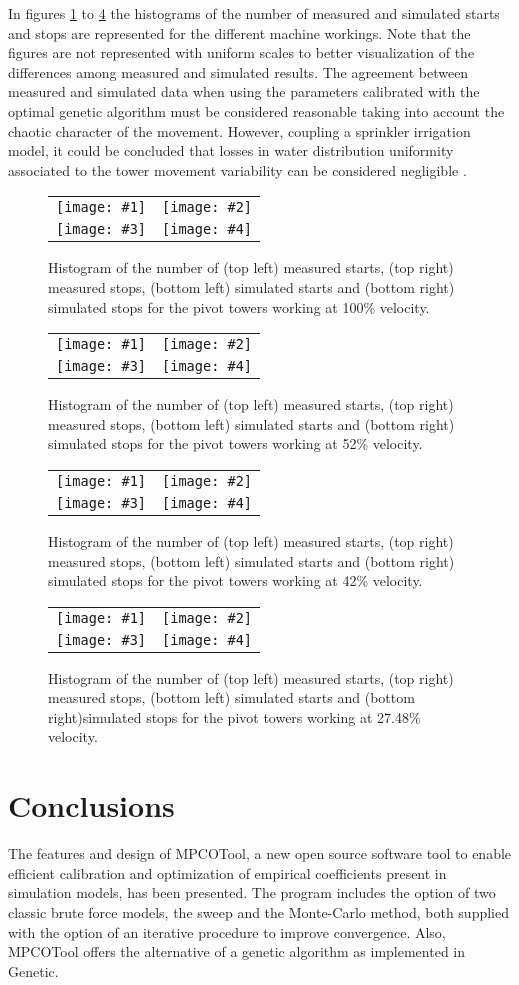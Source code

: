 \documentclass[review,authoryear]{elsarticle}
\newcommand{\FIGIV}[6]
{
	\begin{figure}[ht!]
		\centering
		\begin{tabular}{cc}
			\texttt{[image: \#1]} & \texttt{[image: \#2]} \\
			\texttt{[image: \#3]} & \texttt{[image: \#4]}
		\end{tabular}
		\caption{#5.\label{#6}}
	\end{figure}
}
\begin{document}
In figures \ref{FigPivot100} to \ref{FigPivot27} the histograms of the number
of measured and simulated starts and stops are represented for the different
machine workings.
Note that the figures are not represented with uniform scales to better
visualization of the differences among measured and simulated results.
The agreement between measured and simulated data when using the parameters calibrated with the optimal genetic algorithm must be considered reasonable taking into account the chaotic character of the movement.
However, coupling a sprinkler irrigation model, it could be concluded that losses in water distribution uniformity associated to the tower movement variability can be considered negligible \citep{Ouazaa15}.

\FIGIV{pivot-measured-starts-100.eps}{pivot-measured-stops-100.eps}
{pivot-simulated-starts-100.eps}{pivot-simulated-stops-100.eps}
{Histogram of the number of (top left) measured starts, (top right) measured stops, (bottom left)
simulated starts and (bottom right) simulated stops for the pivot towers working at 100\%
velocity}{FigPivot100}

\FIGIV{pivot-measured-starts-52.eps}{pivot-measured-stops-52.eps}
{pivot-simulated-starts-52.eps}{pivot-simulated-stops-52.eps}
{Histogram of the number of (top left) measured starts, (top right) measured stops, (bottom left)
simulated starts and (bottom right) simulated stops for the pivot towers working at 52\%
velocity}{FigPivot52}

\FIGIV{pivot-measured-starts-42.eps}{pivot-measured-stops-42.eps}
{pivot-simulated-starts-42.eps}{pivot-simulated-stops-42.eps}
{Histogram of the number of (top left) measured starts, (top right) measured stops, (bottom left)
simulated starts and (bottom right) simulated stops for the pivot towers working at 42\%
velocity}{FigPivot42}

\FIGIV{pivot-measured-starts-27,48.eps}{pivot-measured-stops-27,48.eps}
{pivot-simulated-starts-27,48.eps}{pivot-simulated-stops-27,48.eps}
{Histogram of the number of (top left) measured starts, (top right) measured stops, (bottom left)
simulated starts and (bottom right)simulated stops for the pivot towers working at 27.48\% velocity}{FigPivot27}

\section{Conclusions}

The features and design of MPCOTool, a new open source software tool to enable efficient calibration and optimization of empirical coefficients present in simulation models, has been presented. The program includes the option of two classic brute force models, the sweep and the Monte-Carlo method, both supplied with the option of an iterative procedure to improve convergence. Also, MPCOTool offers the alternative of a genetic algorithm as implemented in Genetic.
\end{document}
